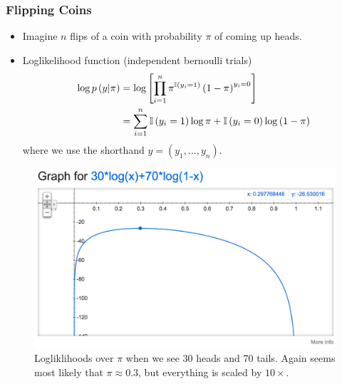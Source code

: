\documentclass[10pt,mathserif]{beamer}
\begin{document}
\begin{frame}
  \frametitle{Flipping Coins}
  \begin{itemize}
  \item Imagine $n$ flips of a coin with probability $\pi$ of coming up heads.
  \item Loglikelihood function (independent bernoulli trials)
    \begin{align*}
      \log p\left(y \vert \pi \right) &= \log \left[\prod_{i = 1}^{n} \pi^{\mathbb{I}\left({y_i = 1}\right)}\left(1 - \pi\right)^{y_i = 0}\right] \\
      &= \sum_{i = 1}^{n} \mathbb{I}\left({y_i = 1}\right)\log \pi + \mathbb{I}\left({y_i = 0}\right)\log\left(1 - \pi\right)
    \end{align*}
    where we use the shorthand $y = \left(y_1, \dots, y_n\right)$.
  \end{itemize} 
  \begin{figure}[ht]
    \centering
    \includegraphics[width=0.3\paperwidth]{figure/loglikelihood_bernoulli_100}
    \caption{Logliklihoods over $\pi$ when we see 30 heads and 70 tails. Again seems
      most likely that $\pi \approx 0.3$, but everything is scaled by $10
      \times$. \label{fig:loglikelihood_bernoulli_100} }
  \end{figure}
\end{frame}

\end{document}
